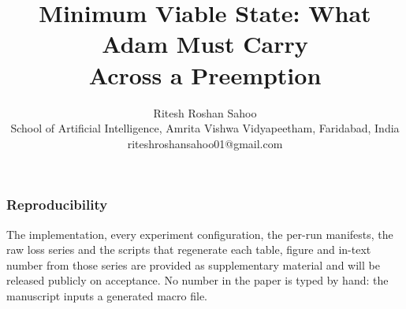 \documentclass[10pt]{article}
\title{Minimum Viable State: What Adam Must Carry\\Across a Preemption}
\author{\name Ritesh Roshan Sahoo\\
\addr School of Artificial Intelligence, Amrita Vishwa Vidyapeetham, Faridabad, India\\
{\normalfont\small\ttfamily riteshroshansahoo01@gmail.com}}
\begin{document}
\maketitle

\begin{abstract}

\end{abstract}












\subsubsection*{Reproducibility}
The implementation, every experiment configuration, the per-run manifests, the raw loss series and the scripts that
regenerate each table, figure and in-text number from those series are provided as supplementary material and will be
released publicly on acceptance. No number in the paper is typed by hand: the manuscript inputs a generated macro file.




\clearpage
\appendix

\end{document}
